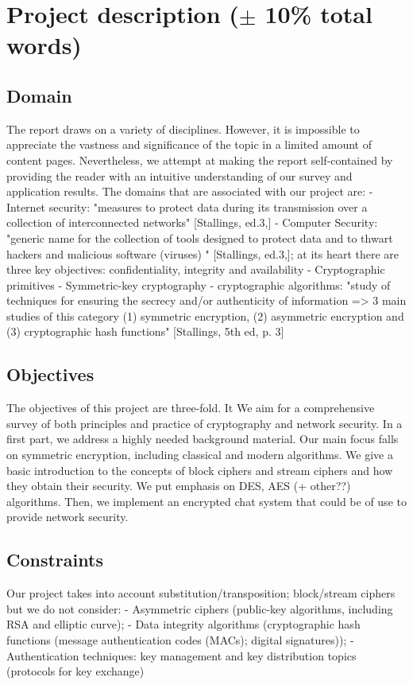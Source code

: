 \section{Project description ($\pm$ 10\% total words) }
\subsection{Domain}
The report draws on a variety of disciplines. However, it is impossible to appreciate the vastness and significance of the topic in a limited amount of content pages. Nevertheless, we attempt at making the report self-contained by providing the reader with an intuitive understanding of our survey and application results.
The domains that are associated with our project are: 
-	Internet security: "measures to protect data during its transmission over a collection of interconnected networks" [Stallings, ed.3,]
-	Computer Security: "generic name for the collection of tools designed to protect data and to thwart hackers and malicious software (viruses) " [Stallings, ed.3,]; at its heart there are three key objectives: confidentiality, integrity and availability
-	Cryptographic primitives
-	Symmetric-key cryptography
-	cryptographic algorithms: "study of techniques for ensuring the secrecy and/or authenticity of information => 3 main studies of this category (1) symmetric encryption, (2) asymmetric encryption and (3) cryptographic hash functions" [Stallings, 5th ed, p. 3]



\subsection{Objectives}
The objectives of this project are three-fold. It We aim for a comprehensive survey of both principles and practice of cryptography and network security. In a first part, we address a highly needed background material.  Our main focus falls on symmetric encryption, including classical and modern algorithms. We give a basic introduction to the concepts of block ciphers and stream ciphers and how they obtain their security. We put emphasis on DES, AES (+ other??) algorithms. Then, we implement an encrypted chat system that could be of use to provide network security.
\subsection{Constraints}
Our project takes into account substitution/transposition; block/stream ciphers but we do not consider:
-	Asymmetric ciphers (public-key algorithms, including RSA and elliptic curve); 
-	Data integrity algorithms (cryptographic hash functions (message authentication codes (MACs); digital signatures)); 
-	Authentication techniques: key management and key distribution topics (protocols for key exchange)

